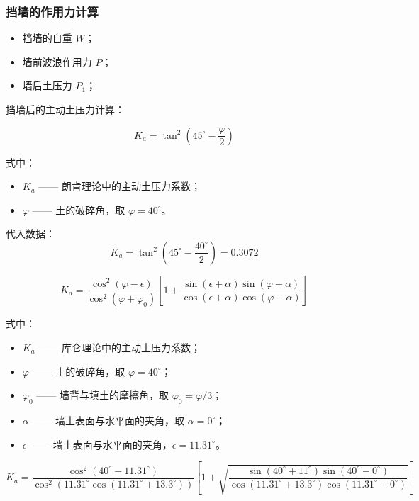 \documentclass[UTF8, a4paper, 12pt]{ctexart} %
\begin{document}
\subsubsection{挡墙的作用力计算}
\begin{itemize}
    \item 挡墙的自重 $W$；
\end{itemize}
\begin{itemize}
    \item 墙前波浪作用力 $P$；
\end{itemize}
\begin{itemize}
    \item 墙后土压力 $P_1$；
\end{itemize}

挡墙后的主动土压力计算：

\[
K_a = \tan^2 \left( 45^\circ - \frac{\varphi}{2} \right)
\]

式中：
\begin{itemize}
    \item $K_a$ —— 朗肯理论中的主动土压力系数；
    \item $\varphi$ —— 土的破碎角，取 $\varphi = 40^\circ$。
\end{itemize}

代入数据：
\[
K_a = \tan^2 \left( 45^\circ - \frac{40^\circ}{2} \right) = 0.3072
\]

\[
K_a = \frac{\cos^2 (\varphi - \epsilon)}{\cos^2 (\varphi + \varphi_0)} \left[ 1 + \frac{\sin (\epsilon + \alpha) \sin (\varphi - \alpha)}{\cos (\epsilon + \alpha) \cos (\varphi - \alpha)} \right]
\]

式中：
\begin{itemize}
    \item $K_a$ —— 库仑理论中的主动土压力系数；
    \item $\varphi$ —— 土的破碎角，取 $\varphi = 40^\circ$；
    \item $\varphi_0$ —— 墙背与填土的摩擦角，取 $\varphi_0 = \varphi / 3$；
    \item $\alpha$ —— 墙土表面与水平面的夹角，取 $\alpha = 0^\circ$；
    \item $\epsilon$ —— 墙土表面与水平面的夹角，$\epsilon = 11.31^\circ$。
\end{itemize}

\[
K_a = \frac{\cos^2 \left( 40^\circ - 11.31^\circ \right)}{\cos^2 \left( 11.31^\circ \cos \left( 11.31^\circ + 13.3^\circ \right) \right)} 
\left[ 
1 + \sqrt{\frac{\sin \left( 40^\circ + 11^\circ \right) \sin \left( 40^\circ - 0^\circ \right)}{\cos \left( 11.31^\circ + 13.3^\circ \right) \cos \left( 11.31^\circ - 0^\circ \right)}}
\right]
\]
\end{document}
